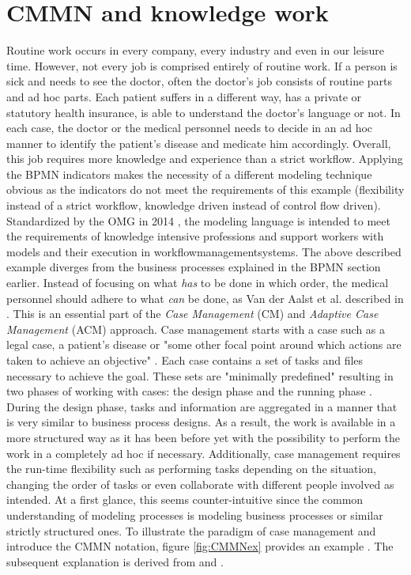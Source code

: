 \section{CMMN and knowledge work}
Routine work occurs in every company, every industry and even in our leisure time. However, not every job is comprised entirely of routine work. If a person is sick and needs to see the doctor, often the doctor's job consists of routine parts and ad hoc parts. Each patient suffers in a different way, has a private or statutory health insurance, is able to understand the doctor's language or not. In each case, the doctor or the medical personnel needs to decide in an ad hoc manner to identify the patient's disease and medicate him accordingly. Overall, this job requires more knowledge and experience than a strict workflow. Applying the BPMN indicators makes the necessity of a different modeling technique obvious as the indicators do not meet the requirements of this example (flexibility instead of a strict workflow, knowledge driven instead of control flow driven).
Standardized by the OMG in 2014 \cite{CMMNspec2014}, the modeling language is intended to meet the requirements of knowledge intensive professions and support workers with models and their execution in workflowmanagementsystems. 
The above described example diverges from the business processes explained in the BPMN section earlier. Instead of focusing on what \textit{has} to be done in which order, the medical personnel should adhere to what \textit{can} be done, as Van der Aalst et al. described in \cite{aalst2005}. This is an essential part of the \textit{Case Management} (CM) and \textit{Adaptive Case Management} (ACM) approach. Case management starts with a case such as a legal case, a patient's disease or "some other focal point around which actions are taken to achieve an objective" \cite{CMMNspec2014}. Each case contains a set of tasks and files necessary to achieve the goal. These sets are "minimally predefined" \cite{CMMNspec2014} resulting in two phases of working with cases: the design phase and the running phase \cite{CMMNspec2014}. During the design phase, tasks and information are aggregated in a manner that is very similar to business process designs. As a result, the work is available in a more structured way as it has been before yet with the possibility to perform the work in a completely ad hoc if necessary. Additionally, case management requires the run-time flexibility such as performing tasks depending on the situation, changing the order of tasks or even collaborate with different people involved as intended. 
At a first glance, this seems counter-intuitive since the common understanding of modeling processes is modeling business processes or similar strictly structured ones. To illustrate the paradigm of case management and introduce the CMMN notation, figure \ref{fig:CMMNex} provides an example . The subsequent explanation is derived from \cite{CMMNspec2014} and \cite{hinkelmann2015}.

